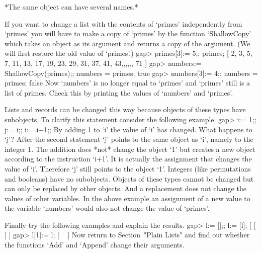 *The same object can have several names.*

If you want to change a list with the  contents of `primes' independently
from `primes'  you will have to  make a copy of  `primes' by the function
`ShallowCopy' which takes an object as its argument and returns a copy of
the argument. (We will first restore the old value of `primes'.)
\beginexample
    gap> primes[3]:= 5;; primes;
    [ 2, 3, 5, 7, 11, 13, 17, 19, 23, 29, 31, 37, 41, 43,,,,,, 71 ]
    gap> numbers:= ShallowCopy(primes);; numbers = primes;
    true
    gap> numbers[3]:= 4;; numbers = primes;
    false 
\endexample
Now `numbers' is no longer equal to `primes' and `primes' still is a list
of primes.  Check this by printing the values of `numbers' and `primes'.

Lists and records can be changed this way because {\GAP} objects of these
types have subobjects.
To clarify this statement consider the following example.
\beginexample
    gap> i:= 1;; j:= i;; i:= i+1;; 
\endexample
By adding 1 to `i' the value of `i' has  changed.   What  happens to `j'?
After the second statement `j' points to the same object  as `i',  namely
to the  integer 1.  The  addition  does *not* change  the object `1'  but
creates a new object according  to the instruction `i+1'.  It is actually
the assignment that changes the value of `i'.  Therefore `j' still points
to  the object `1'.  Integers  (like permutations and  booleans)  have no
subobjects.  Objects  of these types  cannot  be  changed but can only be
replaced by other objects.   And a replacement does not change the values
of other variables.  In the above example an assignment of a new value to
the variable `numbers' would also not change the value of `primes'.

Finally try the following examples and explain the results.
\beginexample
    gap> l:= [];; l:= [l];
    [ [  ] ]
    gap> l[1]:= l;
    [ ~ ]
\endexample
Now return to Section~"Plain Lists" and find out whether the functions
`Add' and `Append' change their arguments.


